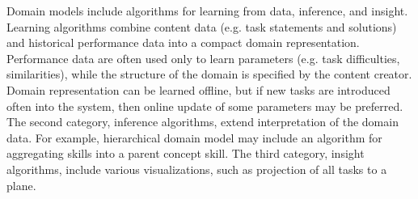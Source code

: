 %
%
%


Domain models include algorithms for learning from data, inference, and insight.
Learning algorithms combine content data (e.g. task statements and solutions)
and %
historical performance data into a compact domain representation.
Performance data are often used only to learn parameters
(e.g. task difficulties, similarities), while the structure of the domain is
specified by the content creator.
Domain representation can be learned offline, but if new tasks are introduced
often into the system, then online update of some parameters may be preferred.
The second category, inference algorithms, extend interpretation of the domain data.
For example, hierarchical domain model may include an algorithm for
aggregating skills into a parent concept skill. %
The third category, insight algorithms, include various visualizations,
such as projection of all tasks to a plane. %


